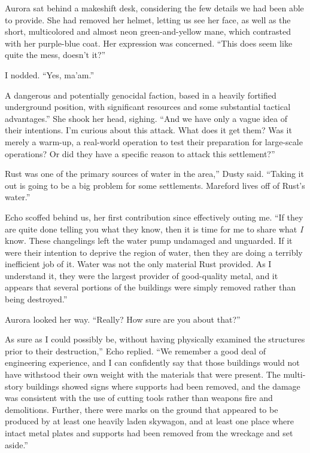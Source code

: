 Aurora sat behind a makeshift desk, considering the few details we had been able to provide. She had removed her helmet, letting us see her face, as well as the short, multicolored and almost neon green-and-yellow mane, which contrasted with her purple-blue coat. Her expression was concerned. “This does seem like quite the mess, doesn’t it?”

I nodded. “Yes, ma’am.”

\leavevmode{}A dangerous and potentially genocidal faction, based in a heavily fortified underground position, with significant resources and some substantial tactical advantages.” She shook her head, sighing. “And we have only a vague idea of their intentions. I’m curious about this attack. What does it get them? Was it merely a warm-up, a real-world operation to test their preparation for large-scale operations? Or did they have a specific reason to attack this settlement?”

\leavevmode{}Rust was one of the primary sources of water in the area,” Dusty said. “Taking it out is going to be a big problem for some settlements. Mareford lives off of Rust’s water.”

Echo scoffed behind us, her first contribution since effectively outing me. “If they are quite done telling you what they know, then it is time for me to share what \textit{I} know. These changelings left the water pump undamaged and unguarded. If it were their intention to deprive the region of water, then they are doing a terribly inefficient job of it. Water was not the only material Rust provided. As I understand it, they were the largest provider of good-quality metal, and it appears that several portions of the buildings were simply removed rather than being destroyed.”

Aurora looked her way. “Really? How sure are you about that?”

\leavevmode{}As sure as I could possibly be, without having physically examined the structures prior to their destruction,” Echo replied. “We remember a good deal of engineering experience, and I can confidently say that those buildings would not have withstood their own weight with the materials that were present. The multi-story buildings showed signs where supports had been removed, and the damage was consistent with the use of cutting tools rather than weapons fire and demolitions. Further, there were marks on the ground that appeared to be produced by at least one heavily laden skywagon, and at least one place where intact metal plates and supports had been removed from the wreckage and set aside.”

